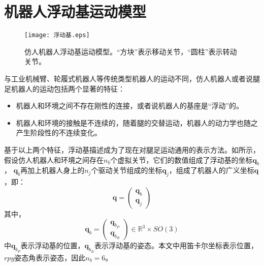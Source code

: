 \section{机器人浮动基运动模型}
\label{sec:floating_base}
\begin{figure}[htbp]
    \centering
    \texttt{[image: 浮动基.eps]}
    \caption{\label{fig:floating_base}仿人机器人浮动基运动模型。“方块”表示移动关节，“圆柱”表示转动关节。}
\end{figure}
与工业机械臂、轮履式机器人等传统类型机器人的运动不同，仿人机器人或者说腿足机器人的运动包括两个显著的特征：
\begin{itemize}
    \item 机器人和环境之间不存在刚性的连接，或者说机器人的基座是“浮动”的。
    \item 机器人和环境的接触是不连续的，随着腿的交替运动，机器人的动力学也随之产生阶段性的不连续变化。
\end{itemize}
基于以上两个特征，浮动基描述成为了现在对腿足运动通用的表示方法。如所示，假设仿人机器人和环境之间存在$n_b$个虚拟关节，它们的数值组成了浮动基的坐标$\boldsymbol{q}_b$，
$\boldsymbol{q}_b$再加上机器人身上的$n_j$个驱动关节组成的坐标$\boldsymbol{q}_j$，组成了机器人的广义坐标$\boldsymbol{q}$，即：
\begin{equation}
    \label{equ:general_coor}
    \boldsymbol{q}=\left(\begin{array}{c}
        \boldsymbol{q}_b \\
        \boldsymbol{q}_j
        \end{array}\right)
\end{equation}
其中，
\begin{equation}
    \label{equ:floating_coor}
    \boldsymbol{q}_b=\left(\begin{array}{c}
        \boldsymbol{q}_{b_P} \\
        \boldsymbol{q}_{b_R}
        \end{array}\right) \in \mathbb{R}^3 \times SO(3)
\end{equation}
中$ \boldsymbol{q}_{b_P}$表示浮动基的位置，$\boldsymbol{q}_{b_R}$表示浮动基的姿态。本文中用笛卡尔坐标表示位置，$rpy$姿态角表示姿态，因此$n_b = 6$。

